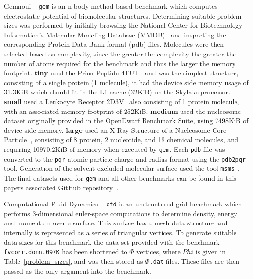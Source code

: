 \documentclass[../document.tex]{subfiles}
\begin{document}
Gemnoui -- {\tt gem} is an n-body-method based benchmark which computes electrostatic potential of biomolecular structures.
Determining suitable problem sizes was performed by initially browsing the National Center for Biotechnology Information's Molecular Modeling Database (MMDB)~\cite{madej2013mmdb} and inspecting the corresponding Protein Data Bank format (pdb) files.
Molecules were then selected based on complexity, since the greater the complexity the greater the number of atoms required for the benchmark and thus the larger the memory footprint.
{\bf tiny} used the Prion Peptide 4TUT~\cite{yu2015crystal} and was the simplest structure, consisting of a single protein (1 molecule), it had the device side memory usage of 31.3KiB which should fit in the L1 cache (32KiB) on the Skylake processor.
{\bf small} used a Leukocyte Receptor 2D3V~\cite{shiroishi2006crystal} also consisting of 1 protein molecule, with an associated memory footprint of 252KiB.
{\bf medium} used the nucleosome dataset originally provided in the OpenDwarf Benchmark Suite, using 7498KiB of device-side memory.
{\bf large} used an X-Ray Structure of a Nucleosome Core Particle~\cite{davey2002solvent}, consisting of 8 protein, 2 nucleotide, and 18 chemical molecules, and requiring 10970.2KiB of memory when executed by {\tt gem}.
Each {\tt pdb} file was converted to the {\tt pqr} atomic particle charge and radius format using the {\tt pdb2pqr}~\cite{dolinsky2004pdb2pqr} tool.
Generation of the solvent excluded molecular surface used the tool {\tt msms}~\cite{sanner1996reduced}.
The final datasets used for {\tt gem} and all other benchmarks can be found in this papers associated GitHub repository~\cite{johnston2017}.

Computational Fluid Dynamics -- {\tt cfd} is an unstructured grid benchmark which performs 3-dimensional euler-space computations to determine density, energy and momentum over a surface.
This surface has a mesh data structure and internally is represented as a series of triangular vertices.
To generate suitable data sizes for this benchmark the data set provided with the benchmark {\tt fvcorr.domn.097K} has been shortened to $\Phi$ vertices, where $Phi$ is given in Table~\ref{problem_sizes}, and was then stored as $\Phi${\tt.dat} files.
These files are then passed as the only argument into the benchmark.
\end{document}
